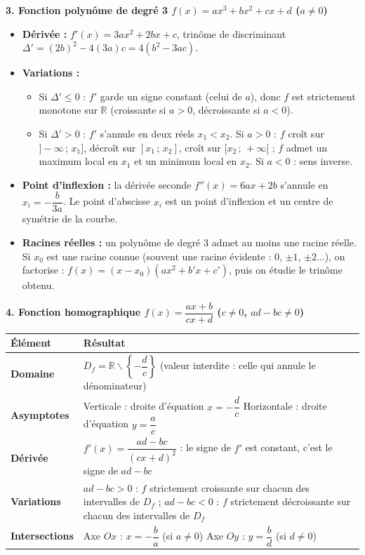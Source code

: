\documentclass[11pt]{article}
\def\setminus{\mathbin{\backslash}}\let\smallsetminus\setminus
\begin{document}
\textbf{3. Fonction polynôme de degré 3 $f(x)=ax^3+bx^2+cx+d$ ($a\neq0$)}\par
\begin{itemize}
  \item \textbf{Dérivée :} $f'(x)=3ax^2+2bx+c$, trinôme de discriminant $\Delta'=(2b)^2-4(3a)c=4(b^2-3ac)$.
  \item \textbf{Variations :}
  \begin{itemize}
    \item Si $\Delta'\le 0$ : $f'$ garde un signe constant (celui de $a$), donc $f$ est strictement monotone sur $\mathbb{R}$ (croissante si $a>0$, décroissante si $a<0$).
    \item Si $\Delta'>0$ : $f'$ s'annule en deux réels $x_1<x_2$. Si $a>0$ : $f$ croît sur $]-\infty\,;\,x_1]$, décroît sur $[x_1\,;\,x_2]$, croît sur $[x_2\,;\,+\infty[$ ; $f$ admet un maximum local en $x_1$ et un minimum local en $x_2$. Si $a<0$ : sens inverse.
  \end{itemize}
  \item \textbf{Point d'inflexion :} la dérivée seconde $f''(x)=6ax+2b$ s'annule en $x_i=-\dfrac{b}{3a}$. Le point d'abscisse $x_i$ est un point d'inflexion et un centre de symétrie de la courbe.
  \item \textbf{Racines réelles :} un polynôme de degré 3 admet au moins une racine réelle. Si $x_0$ est une racine connue (souvent une racine évidente : $0$, $\pm1$, $\pm2$...), on factorise : $f(x)=(x-x_0)(ax^2+b'x+c')$, puis on étudie le trinôme obtenu.
\end{itemize}

\textbf{4. Fonction homographique $f(x)=\dfrac{ax+b}{cx+d}$ ($c\neq0$, $ad-bc\neq0$)}\par
\begin{center}
\begin{tabularx}{\linewidth}{|>{\bfseries}l|X|}\hline
\rowcolor{popblueL} \textbf{Élément} & \textbf{Résultat} \\\hline
\textbf{Domaine} & $D_f=\mathbb{R}\setminus\left\{-\dfrac{d}{c}\right\}$ (valeur interdite : celle qui annule le dénominateur) \\\hline
\textbf{Asymptotes} & Verticale : droite d'équation $x=-\dfrac{d}{c}$ \quad Horizontale : droite d'équation $y=\dfrac{a}{c}$ \\\hline
\textbf{Dérivée} & $f'(x)=\dfrac{ad-bc}{(cx+d)^2}$ : le signe de $f'$ est constant, c'est le signe de $ad-bc$ \\\hline
\textbf{Variations} & $ad-bc>0$ : $f$ strictement croissante sur chacun des intervalles de $D_f$ ; $ad-bc<0$ : $f$ strictement décroissante sur chacun des intervalles de $D_f$ \\\hline
\textbf{Intersections} & Axe $Ox$ : $x=-\dfrac{b}{a}$ (si $a\neq0$) \quad Axe $Oy$ : $y=\dfrac{b}{d}$ (si $d\neq0$) \\\hline
\end{tabularx}
\end{center}
\end{document}
